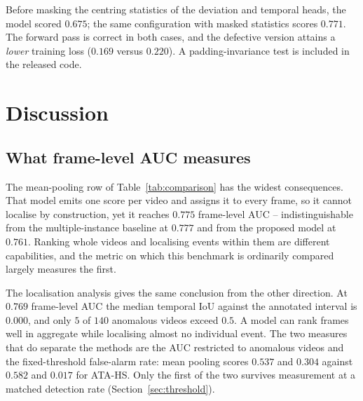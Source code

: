 \documentclass[11pt]{article}
\begin{document}
Before masking the centring statistics of the deviation and temporal heads, the
model scored $0.675$; the same configuration with masked statistics scores
$0.771$. The forward pass is correct in both cases, and the defective version
attains a \emph{lower} training loss ($0.169$ versus $0.220$). A padding-invariance test is included in the released code.



\section{Discussion}
\label{sec:discussion}

\subsection{What frame-level AUC measures}

The mean-pooling row of Table~\ref{tab:comparison} has the widest consequences.
That model emits one score per video and assigns it to every frame, so it cannot
localise by construction, yet it reaches $0.775$ frame-level AUC --
indistinguishable from the multiple-instance baseline at $0.777$ and from the
proposed model at $0.761$. Ranking whole videos and localising events within them
are different capabilities, and the metric on which this benchmark is ordinarily
compared largely measures the first.

The localisation analysis gives the same conclusion from the other direction. At
$0.769$ frame-level AUC the median temporal IoU against the annotated interval is
$0.000$, and only $5$ of $140$ anomalous videos exceed $0.5$. A model can rank
frames well in aggregate while localising almost no individual event. The two
measures that do separate the methods are the AUC restricted to anomalous videos
and the fixed-threshold false-alarm rate: mean pooling scores $0.537$ and $0.304$
against $0.582$ and $0.017$ for ATA-HS. Only the first of the two survives
measurement at a matched detection rate (Section~\ref{sec:threshold}).
\end{document}
